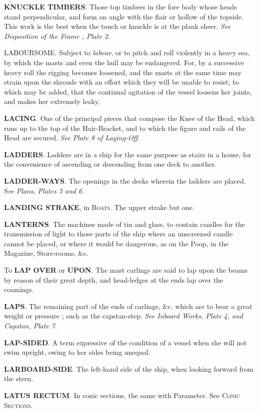 \textbf{KNUCKLE TIMBERS}. Those top timbers in the fore body whose heads stand perpendicular, and form an angle with the flair or hollow of the topside. This work is the best when the touch or knuckle is at the plank sheer. \textit{See Disposition of the Frame , Plate 2}. 

LABOURSOME. Subject to \textit{labour}, or to pitch and roll violently in a heavy sea, by which the masts and even the hull may be endangered. For, by a successive heavy roll the rigging becomes loosened, and the masts at the same time may strain upon the shrouds with an effort which they will be unable to resist; to which may be added, that the continual agitation of the vessel loosens her joints, and makes her extremely leaky. 

\textbf{LACING}. One of the principal pieces that compose the Knee of the Head, which runs up to the top of the Hair-Bracket, and to which the figure and rails of the Head are secured. \textit{See Plate 8 of Laying-Off}. 

\textbf{LADDERS}. Ladders are in a ship for the same purpose as stairs in a house, for the convenience of ascending or descending from one deck to another.

\textbf{LADDER-WAYS}. The openings in the decks wherein the ladders are placed. S\textit{ee Plans, Plates 5 and 6}. 

\textbf{LANDING STRAKE}, in \textsc{Boats}. The upper strake but one. 

\textbf{LANTERNS}. The machines made of tin and glass, to contain candles for the transmission of light to those parts of the ship where an unscreened candle cannot be placed, or where it would be dangerous, as on the Poop, in the Magazine, Store-rooms, \&c. 

To \textbf{LAP OVER} or \textbf{UPON}. The mast carlings are said to lap upon the beams by reason of their great depth, and head-ledges at the ends lap over the coamings. 

\textbf{LAPS}. The remaining part of the ends of carlings, \&c. which are to bear a great weight or pressure ; such as the capstan-step. \textit{See Inboard Works, Plate 4, and Capstan, Plate 7}. 

\textbf{LAP-SIDED}. A term expressive of the condition of a vessel when she will not swim upright, owing to her sides being unequal. 

\textbf{LARBOARD-SIDE}. The left-hand side of the ship, when looking forward from the stern. 

\textbf{LATUS RECTUM}. In conic sections, the same with Parameter. See \textsc{Conic Sections}. 

